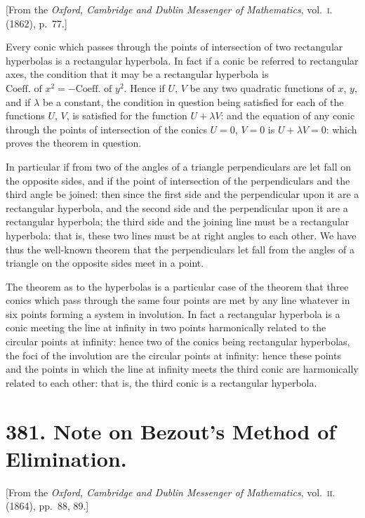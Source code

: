 \documentclass[11pt,a4paper]{article}
\begin{document}
[From the \textit{Oxford, Cambridge and Dublin Messenger of Mathematics}, vol.\ \textsc{i}. (1862), p.\ 77.]

Every conic which passes through the points of intersection of two rectangular
hyperbolas is a rectangular hyperbola. In fact if a conic be referred to rectangular
axes, the condition that it may be a rectangular hyperbola is $\text{Coeff.\ of }x^2 = -\text{Coeff.\ of }y^2$.
Hence if $U$, $V$ be any two quadratic functions of $x$, $y$, and if $\lambda$ be a constant, the
condition in question being satisfied for each of the functions $U$, $V$, is satisfied for
the function $U+\lambda V$: and the equation of any conic through the points of intersection
of the conics $U=0$, $V=0$ is $U+\lambda V=0$: which proves the theorem in question.

In particular if from two of the angles of a triangle perpendiculars are let fall
on the opposite sides, and if the point of intersection of the perpendiculars and the
third angle be joined: then since the first side and the perpendicular upon it are a
rectangular hyperbola, and the second side and the perpendicular upon it are a
rectangular hyperbola; the third side and the joining line must be a rectangular
hyperbola: that is, these two lines must be at right angles to each other. We have
thus the well-known theorem that the perpendiculars let fall from the angles of a
triangle on the opposite sides meet in a point.

The theorem as to the hyperbolas is a particular case of the theorem that three
conics which pass through the same four points are met by any line whatever in
six points forming a system in involution. In fact a rectangular hyperbola is a conic
meeting the line at infinity in two points harmonically related to the circular points
at infinity: hence two of the conics being rectangular hyperbolas, the foci of the
involution are the circular points at infinity: hence these points and the points in
which the line at infinity meets the third conic are harmonically related to each other:
that is, the third conic is a rectangular hyperbola.

\newpage


\section*{381. Note on Bezout's Method of Elimination.}

[From the \textit{Oxford, Cambridge and Dublin Messenger of Mathematics}, vol.\ \textsc{ii}. (1864), pp.\ 88, 89.]
\end{document}
